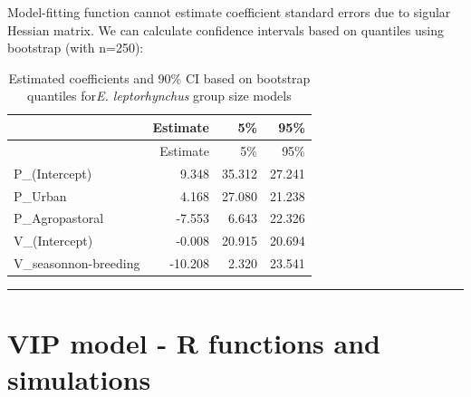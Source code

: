 \documentclass[]{article}
\begin{document}
Model-fitting function cannot estimate coefficient standard errors due
to sigular Hessian matrix. We can calculate confidence intervals based
on quantiles using bootstrap (with n=250):

\begin{longtable}[]{@{}lrrr@{}}
\caption{Estimated coefficients and 90\% CI based on bootstrap quantiles
for\textit{E. leptorhynchus} group size models}\tabularnewline
\toprule
& Estimate & 5\% & 95\%\tabularnewline
\midrule
\endfirsthead
\toprule
& Estimate & 5\% & 95\%\tabularnewline
\midrule
\endhead
P\_(Intercept) & 9.348 & 35.312 & 27.241\tabularnewline
P\_Urban & 4.168 & 27.080 & 21.238\tabularnewline
P\_Agropastoral & -7.553 & 6.643 & 22.326\tabularnewline
V\_(Intercept) & -0.008 & 20.915 & 20.694\tabularnewline
V\_seasonnon-breeding & -10.208 & 2.320 & 23.541\tabularnewline
\bottomrule
\end{longtable}

\begin{center}\rule{0.5\linewidth}{\linethickness}\end{center}

\section{VIP model - R functions and
simulations}\label{vip-model---r-functions-and-simulations}
\end{document}
